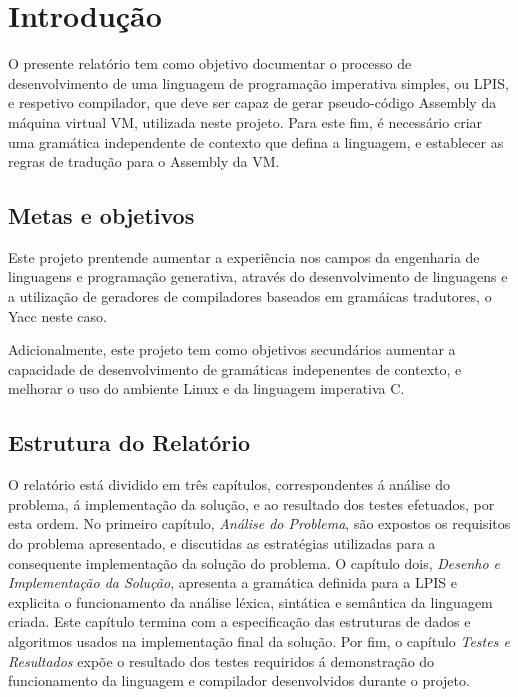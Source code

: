 \chapter*{Introdução}
\label{intro}

O presente relatório tem como objetivo documentar o processo de desenvolvimento de 
uma linguagem de programação imperativa simples, ou LPIS, e respetivo compilador, que
deve ser capaz de gerar pseudo-código Assembly da máquina virtual VM, utilizada neste 
projeto. Para este fim, é necessário criar uma gramática independente de contexto que 
defina a linguagem, e establecer as regras de tradução para o Assembly da VM. 
 

\section*{Metas e objetivos} 

Este projeto prentende aumentar a experiência nos campos da engenharia de linguagens e 
programação generativa, através do desenvolvimento de linguagens e a utilização de geradores 
de compiladores baseados em gramáicas tradutores, o Yacc neste caso.
 
Adicionalmente, este projeto tem como objetivos secundários aumentar a capacidade de 
desenvolvimento de gramáticas indepenentes de contexto, e melhorar o uso do ambiente 
Linux e da linguagem imperativa C.

\section*{Estrutura do Relatório} 

O relatório está dividido em três capítulos, correspondentes á análise do problema, á 
implementação da solução, e ao resultado dos testes efetuados, por esta ordem. 
No primeiro capítulo, \emph{Análise do Problema}, são expostos os requisitos do problema 
apresentado, e discutidas as estratégias utilizadas para a consequente implementação da
solução do problema. O capítulo dois, \emph{Desenho e Implementação da Solução}, apresenta 
a gramática definida para a LPIS e explicita o funcionamento da análise léxica, sintática 
e semântica da linguagem criada. Este capítulo termina com a especificação das estruturas 
de dados e algoritmos usados na implementação final da solução.
Por fim, o capítulo \emph{Testes e Resultados} expõe o resultado dos testes requiridos á
demonstração do funcionamento da linguagem e compilador desenvolvidos durante o projeto. 



